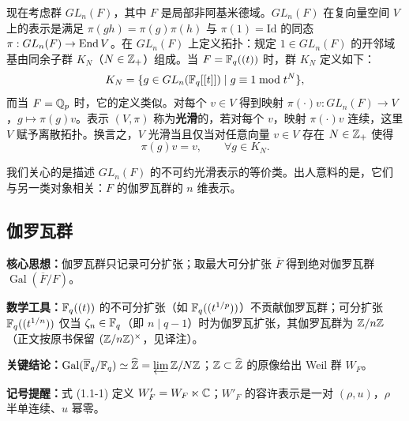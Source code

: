 现在考虑群 $GL_n(F)$，其中 $F$ 是局部非阿基米德域。$GL_n(F)$ 在复向量空间 $V$ 上的表示是满足 $\pi(gh)=\pi(g)\pi(h)$ 与 $\pi(1)=\mathrm{Id}$ 的同态 $\pi:GL_n(F)\to\operatorname{End} V$。在 $GL_n(F)$ 上定义拓扑：规定 $1\in GL_n(F)$ 的开邻域基由同余子群 $K_N$（$N\in\mathbb{Z}_+$）组成。当 $F=\mathbb{F}_q((t))$ 时，群 $K_N$ 定义如下：
\[
    K_N=\{g\in GL_n(\mathbb{F}_q[[t]])\mid g\equiv 1 \bmod t^N\},
\]
而当 $F=\mathbb{Q}_p$ 时，它的定义类似。对每个 $v\in V$ 得到映射 $\pi(\cdot)v:GL_n(F)\to V$，$g\mapsto\pi(g)v$。表示 $(V,\pi)$ 称为\textbf{光滑}的，若对每个 $v$，映射 $\pi(\cdot)v$ 连续，这里 $V$ 赋予离散拓扑。换言之，$V$ 光滑当且仅当对任意向量 $v\in V$ 存在 $N\in\mathbb{Z}_+$ 使得
\[
    \pi(g)v=v,\qquad \forall g\in K_N.
\]


我们关心的是描述 $GL_n(F)$ 的不可约光滑表示的等价类。出人意料的是，它们与另一类对象相关：$F$ 的伽罗瓦群的 $n$ 维表示。


\subsection{伽罗瓦群}

\begin{keypoints}
    \item \textbf{核心思想：}伽罗瓦群只记录可分扩张；取最大可分扩张 $\overline{F}$ 得到绝对伽罗瓦群 $\operatorname{Gal}(\overline{F}/F)$。
    \item \textbf{数学工具：}$\mathbb{F}_q((t))$ 的不可分扩张（如 $\mathbb{F}_q((t^{1/p}))$）不贡献伽罗瓦群；可分扩张 $\mathbb{F}_q((t^{1/n}))$ 仅当 $\zeta_n\in\mathbb{F}_q$（即 $n\mid q-1$）时为伽罗瓦扩张，其伽罗瓦群为 $\mathbb{Z}/n\mathbb{Z}$（正文按原书保留 $(\mathbb{Z}/n\mathbb{Z})^\times$，见译注）。
    \item \textbf{关键结论：}$\operatorname{Gal}(\overline{\mathbb{F}}_q/\mathbb{F}_q)\simeq\widehat{\mathbb{Z}}=\varprojlim\mathbb{Z}/N\mathbb{Z}$；$\mathbb{Z}\subset\widehat{\mathbb{Z}}$ 的原像给出 Weil 群 $W_F$。
    \item \textbf{记号提醒：}式 (1.1-1) 定义 $W'_F=W_F\ltimes\mathbb{C}$；$W'_F$ 的容许表示是一对 $(\rho,u)$，$\rho$ 半单连续、$u$ 幂零。
\end{keypoints}

